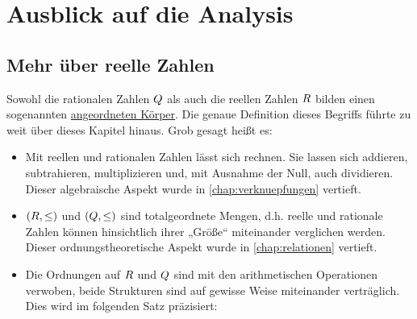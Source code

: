 



\chapter{Ausblick auf die Analysis} \label{chap:analysis}


\section{Mehr über reelle Zahlen}

\begin{bem}
    Sowohl die rationalen Zahlen $\relax Q$ als auch die reellen Zahlen $\relax R$ bilden einen sogenannten \href{https://en.wikipedia.org/wiki/Ordered_field}{angeordneten Körper}. Die genaue Definition dieses Begriffs führte zu weit über dieses Kapitel hinaus. Grob gesagt heißt es:
    \begin{itemize}
        \item Mit reellen und rationalen Zahlen lässt sich rechnen. Sie lassen sich addieren, subtrahieren, multiplizieren und, mit Ausnahme der Null, auch dividieren. Dieser algebraische Aspekt wurde in \cref{chap:verknuepfungen} vertieft.
        \item $(\relax R,\le)$ und $(\relax Q,\le)$ sind totalgeordnete Mengen, d.h. reelle und rationale Zahlen können hinsichtlich ihrer „Größe“ miteinander verglichen werden. Dieser ordnungstheoretische Aspekt wurde in \cref{chap:relationen} vertieft.
        \item Die Ordnungen auf $\relax R$ und $\relax Q$ sind mit den arithmetischen Operationen verwoben, beide Strukturen sind auf gewisse Weise miteinander verträglich. Dies wird im folgenden Satz präzisiert:
    \end{itemize}
\end{bem}


